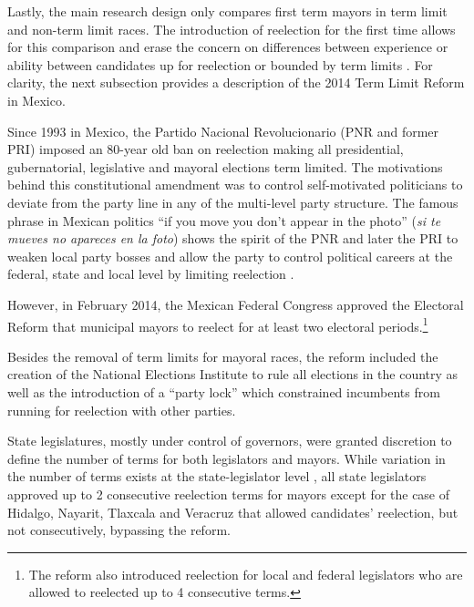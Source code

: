 \documentclass[12pt]{amsart}
\makeatletter
\def\subsection{\@startsection{subsection}{2}
	\z@{.8\linespacing\@plus.7\linespacing}{.7\linespacing}{\large}}
\numberwithin{equation}{section}
\theoremstyle{definition}
\theoremstyle{definition}
\theoremstyle{definition}
\makeatother
\begin{document}
Lastly, the main research design only compares first term mayors in term limit and non-term limit races. The introduction of reelection for the first time allows for this comparison and erase the concern on differences between experience or ability between candidates up for reelection or bounded by term limits \citep{ferraz_finan_2008, ferraz_finan_2011}. For clarity, the next subsection provides a description of the 2014 Term Limit Reform in Mexico.  

\subsection{Mexico's 2014 Term Limi Reform}

Since 1993 in Mexico, the Partido Nacional Revolucionario (PNR and former PRI) imposed an 80-year old ban on reelection making all presidential, gubernatorial, legislative and mayoral elections term limited. The motivations behind this constitutional amendment was to control self-motivated politicians to deviate from the party line in any of the multi-level party structure. The famous phrase in Mexican politics ``if you move you don't appear in the photo'' (\emph{si te mueves no apareces en la foto}) shows the spirit of the PNR and later the PRI to weaken  local party bosses and allow the party to control political careers at the federal, state and local level by limiting reelection \citep{weldon_2003}. 

   
However, in February 2014, the Mexican Federal Congress approved the Electoral Reform that municipal mayors to reelect for at least two electoral periods.\footnote{The reform also introduced reelection for local and federal legislators who are allowed to reelected up to 4 consecutive terms.} %

Besides the removal of term limits for mayoral races, the reform included the creation of the National Elections Institute to rule all elections in the country as well as the introduction of a ``party lock'' which constrained incumbents from running for reelection with other parties. 


State legislatures, mostly under control of governors, were granted discretion to define the number of terms for both legislators and mayors. While variation in the number of terms exists at the state-legislator level \citep{motolinia_2020}, all state legislators approved up to 2 consecutive reelection terms for mayors except for the case of Hidalgo, Nayarit, Tlaxcala and Veracruz that allowed candidates' reelection, but not consecutively, bypassing the reform.  
\end{document}
